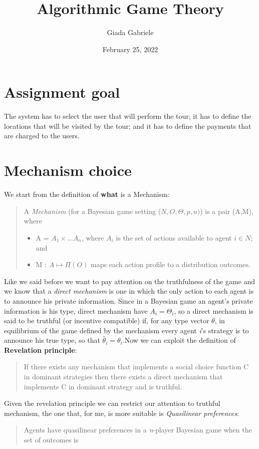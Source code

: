 \documentclass{article}
\title{Algorithmic Game Theory}
\author{Giada Gabriele}
\date{February 25, 2022}
\begin{document}
\maketitle
\section{Assignment goal}
\large{
The system has to select the user that will perform the tour; it has to define the locations that will be visited by the tour; and it has to define the payments that are charged to the users.
}
\section{Mechanism choice}
\large{
We start from the definition of \textbf{what} is a Mechanism:
\begin{quote}
    A \textit{Mechanism} (for a Bayesian game setting ($N,O,\Theta,p,u)$) is a pair (A,M), where
    \begin{itemize}
        \item A = $A_1 \times \dots A_n$, where $A_i$ is the set of actions available to agent $i \in N$; and
        \item M : $A \mapsto \Pi(O)$ maps each action profile to a distribution outcomes.
    \end{itemize}
\end{quote}
Like we said before we want to pay attention on the truthfulness of the game and we know that a \textit{direct mechanism} is one in which the only action to each agent is to announce his private information. Since in a Bayesian game an agent's private information is his type, direct mechanism have $A_i = \Theta_i$, so a direct mechanism is said to be truthful (or incentive compatible) if, for any type vector $\theta$, in equilibrium of the game defined by the mechanism every agent \textit{i}'s strategy is to announce his true type, so that $\hat{\theta}_i = \theta_i$.\newpage Now we can exploit the definition of \textbf{Revelation principle}:
\begin{quote}
    If there exists any mechanism that implements a social choice function C in dominant strategies then there exists a direct mechanism that implements C in dominant strategy and is truthful.
\end{quote}
Given the revelation principle we can restrict our attention to truthful mechanism, the one that, for me, is more suitable is \textit{Quasilinear preferences}:
\begin{quote}
    Agents have quasilinear preferences in a \textit{n}-player Bayesian game when the set of outcomes is

\end{quote}}
\end{document}
